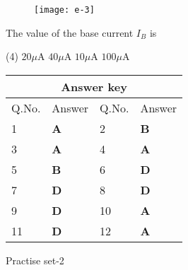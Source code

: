 \begin{enumerate}
	\begin{figure}[H]
		\centering
		\texttt{[image: e-3]}
	\end{figure}
	The value of the base current $I_{B}$ is
	{	}
	\begin{tasks}(4)
		\task[\textbf{A.}] $20 \mu \mathrm{A}$
		\task[\textbf{B.}]  $40 \mu \mathrm{A}$
		\task[\textbf{C.}] $10 \mu \mathrm{A}$
		\task[\textbf{D.}] $100 \mu \mathrm{A}$
	\end{tasks}
\end{enumerate}
\setlength\arrayrulewidth{1pt}
\begin{table}[H]
	\centering
	\begin{tabular}{|p{1.5cm}|p{1.5cm}||p{1.5cm}|p{1.5cm}|}
		\hline
		\multicolumn{4}{|c|}{\textbf{Answer key}}\\\hline\hline
		\rowcolor{ocrel}Q.No.&Answer&Q.No.&Answer\\\hline
		1&\textbf{A} &2&\textbf{B}\\\hline 
		3&\textbf{A} &4&\textbf{A} \\\hline
		5&\textbf{B} &6&\textbf{D} \\\hline
		7&\textbf{D}&8&\textbf{D}\\\hline
		9&\textbf{D}&10&\textbf{A}\\\hline
		11&\textbf{D} &12&\textbf{A}\\\hline
		
	\end{tabular}
\end{table}
\newpage
\begin{abox}
	Practise set-2
\end{abox}
